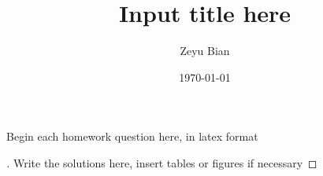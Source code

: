 \documentclass[en,hazy,blue,12pt,normal]{elegantnote}
\title{Input title here}
\author{Zeyu Bian}
\date{\today}
\begin{document}
\maketitle

\begin{homework}
Begin each homework question here, in latex format
\end{homework}

\begin{proof}[\solutionname]
    Write the solutions here, insert tables or figures if necessary
\end{proof}
\end{document}
